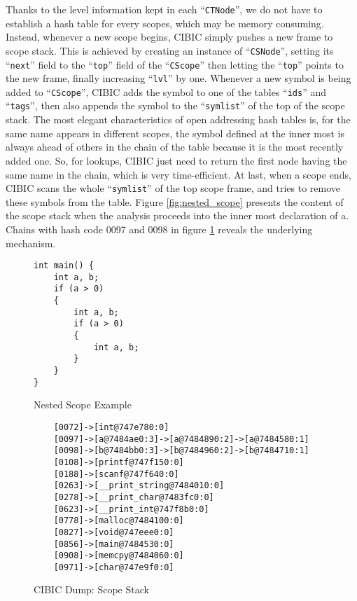 \documentclass[10pt, a4paper]{article}
\begin{document}
Thanks to the level information kept in each ``\texttt{CTNode}'', we do not
have to establish a hash table for every scopes, which may be memory consuming.
Instead, whenever a new scope begins, CIBIC simply pushes a new frame to scope
stack. This is achieved by creating an instance of ``\texttt{CSNode}'', setting
its ``\texttt{next}'' field to the ``\texttt{top}'' field of the
``\texttt{CScope}'' then letting the ``\texttt{top}'' points to the new frame,
finally increasing ``\texttt{lvl}'' by one. Whenever a new symbol is being
added to ``\texttt{CScope}'', CIBIC adds the symbol to one of the tables
``\texttt{ids}'' and ``\texttt{tags}'', then also appends the symbol to the
``\texttt{symlist}'' of the top of the scope stack. The most elegant
characteristics of open addressing hash tables is, for the same name appears in
different scopes, the symbol defined at the inner most is always ahead of
others in the chain of the table because it is the most recently added one. So,
for lookups, CIBIC just need to return the first node having the same name in
the chain, which is very time-efficient. At last, when a scope ends, CIBIC
scans the whole ``\texttt{symlist}'' of the top scope frame, and tries to remove
these symbols from the table. Figure \ref{fig:nested_scope} presents the content
of the scope stack when the analysis proceeds into the inner most declaration of
a. Chains with hash code 0097 and 0098 in figure \ref{fig:scope_stack} reveals
the underlying mechanism.
\begin{figure}[H]
    \begin{minipage}{0.35\textwidth}
    \begin{verbatim}
int main() {
    int a, b;
    if (a > 0)
    {
        int a, b;
        if (a > 0)
        {
            int a, b;
        }
    }
}
    \end{verbatim}
    \caption {Nested Scope Example}
    \label{fig:nested_scope}
\end{minipage}
    \begin{minipage}{0.5\textwidth}
    \begin{BVerbatim}
    [0072]->[int@747e780:0]
    [0097]->[a@7484ae0:3]->[a@7484890:2]->[a@7484580:1]
    [0098]->[b@7484bb0:3]->[b@7484960:2]->[b@7484710:1]
    [0108]->[printf@747f150:0]
    [0188]->[scanf@747f640:0]
    [0263]->[__print_string@7484010:0]
    [0278]->[__print_char@7483fc0:0]
    [0623]->[__print_int@747f8b0:0]
    [0778]->[malloc@7484100:0]
    [0827]->[void@747eee0:0]
    [0856]->[main@7484530:0]
    [0908]->[memcpy@7484060:0]
    [0971]->[char@747e9f0:0]
    \end{BVerbatim}
    \caption {CIBIC Dump: Scope Stack}
    \label{fig:scope_stack}
\end{minipage}
\end{figure}
\end{document}
